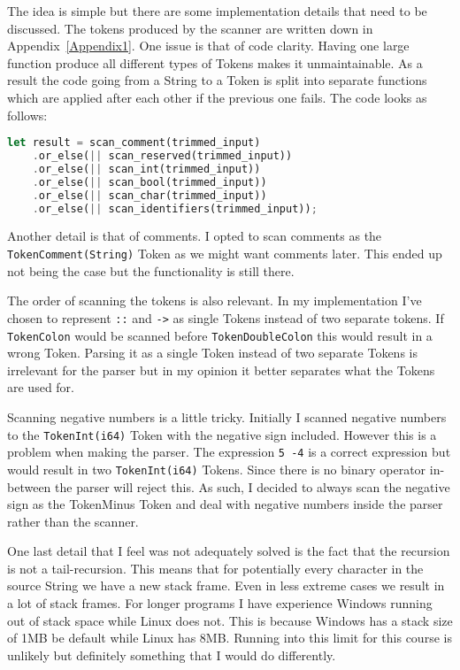 \documentclass{article}
\begin{document}
The idea is simple but there are some implementation details that need to be discussed. The tokens produced by the scanner are written down in Appendix~\ref{Appendix1}. One issue is that of code clarity. Having one large function produce all different types of Tokens makes it unmaintainable. As a result the code going from a String to a Token is split into separate functions which are applied after each other if the previous one fails. The code looks as follows:
\begin{lstlisting}[language=Rust, style=boxed]
let result = scan_comment(trimmed_input)
	.or_else(|| scan_reserved(trimmed_input))
	.or_else(|| scan_int(trimmed_input))
	.or_else(|| scan_bool(trimmed_input))
	.or_else(|| scan_char(trimmed_input))
	.or_else(|| scan_identifiers(trimmed_input));
\end{lstlisting}

Another detail is that of comments. I opted to scan comments as the \texttt{TokenComment(String)} Token as we might want comments later. This ended up not being the case but the functionality is still there.

The order of scanning the tokens is also relevant. In my implementation I've chosen to represent \texttt{::} and \texttt{->} as single Tokens instead of two separate tokens. If \texttt{TokenColon} would be scanned before \texttt{TokenDoubleColon} this would result in a wrong Token. Parsing it as a single Token instead of two separate Tokens is irrelevant for the parser but in my opinion it better separates what the Tokens are used for.

Scanning negative numbers is a little tricky. Initially I scanned negative numbers to the \texttt{TokenInt(i64)} Token with the negative sign included. However this is a problem when making the parser. The expression \texttt{5 -4} is a correct expression but would result in two \texttt{TokenInt(i64)} Tokens. Since there is no binary operator in-between the parser will reject this. As such, I decided to always scan the negative sign as the TokenMinus Token and deal with negative numbers inside the parser rather than the scanner.

One last detail that I feel was not adequately solved is the fact that the recursion is not a tail-recursion. This means that for potentially every character in the source String we have a new stack frame. Even in less extreme cases we result in a lot of stack frames. For longer programs I have experience Windows running out of stack space while Linux does not. This is because Windows has a stack size of 1MB be default while Linux has 8MB. Running into this limit for this course is unlikely but definitely something that I would do differently.
\end{document}
